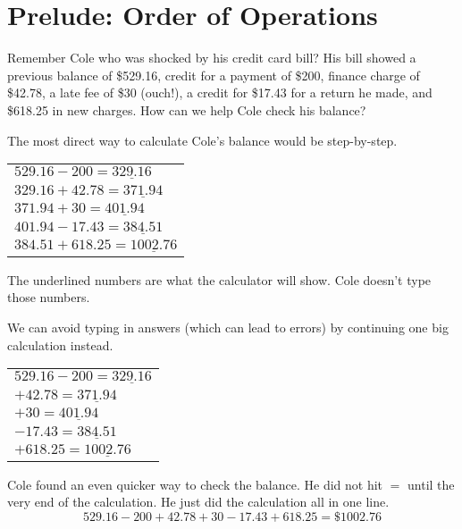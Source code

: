 
\section{Prelude: Order of Operations}

Remember Cole who was shocked by his credit card bill? His bill showed a previous balance of \$529.16, credit for a payment of \$200, finance charge of \$42.78, a late fee of \$30 (ouch!), a credit for \$17.43 for a return he made, and \$618.25 in new charges.  How can we help Cole check his balance?

The most direct way to calculate Cole's balance would be step-by-step.

\begin{center}
\begin{tabular} {l}
$529.16-200 = \underline{329.16}$ \\
$329.16+42.78=\underline{371.94}$ \\
$371.94+30=\underline{401.94}$ \\
$401.94 -17.43=\underline{384.51}$ \\
$384.51+618.25=\underline{1002.76}$ \\ 
\end{tabular}
\end{center}
The underlined numbers are what the calculator will show.  Cole doesn't type those numbers.

We can avoid typing in answers (which can lead to errors) by continuing one big calculation instead.
\begin{center}
\begin{tabular} {l}
$529.16-200 =\underline{329.16}$ \\
\hspace{.35 in} $+42.78=\underline{371.94}$ \\
\hspace{.35 in} $+30= \underline{401.94}$ \\
\hspace{.35 in} $ -17.43=\underline{384.51}$ \\
\hspace{.35 in} $+618.25=\underline{1002.76}$ \\  
\end{tabular}
\end{center}

Cole found an even quicker way to check the balance.  He did not hit $=$ until the very end of the calculation.  He just did the calculation all in one line.
$$529.16 - 200 + 42.78 + 30 - 17.43 + 618.25 = \$1002.76$$

